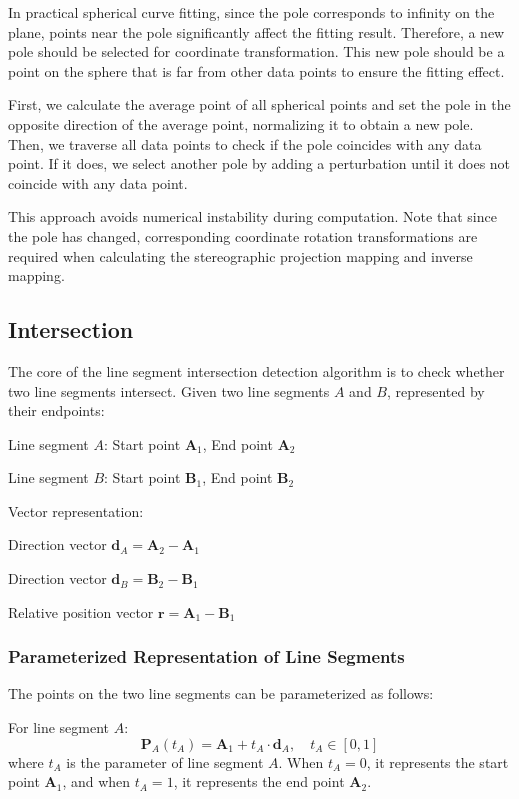 \documentclass[a4paper]{article}
\begin{document}
\begin{sloppypar}
In practical spherical curve fitting, since the pole corresponds to infinity on the plane, points near the pole significantly affect the fitting result. Therefore, a new pole should be selected for coordinate transformation. This new pole should be a point on the sphere that is far from other data points to ensure the fitting effect.

First, we calculate the average point of all spherical points and set the pole in the opposite direction of the average point, normalizing it to obtain a new pole. Then, we traverse all data points to check if the pole coincides with any data point. If it does, we select another pole by adding a perturbation until it does not coincide with any data point.

This approach avoids numerical instability during computation. Note that since the pole has changed, corresponding coordinate rotation transformations are required when calculating the stereographic projection mapping and inverse mapping.

\subsection{Intersection}
The core of the line segment intersection detection algorithm is to check whether two line segments intersect. Given two line segments \(A\) and \(B\), represented by their endpoints:

Line segment \(A\): Start point \(\mathbf{A}_1\), End point \(\mathbf{A}_2\)

Line segment \(B\): Start point \(\mathbf{B}_1\), End point \(\mathbf{B}_2\)

Vector representation:

Direction vector \(\mathbf{d}_A = \mathbf{A}_2 - \mathbf{A}_1\)

Direction vector \(\mathbf{d}_B = \mathbf{B}_2 - \mathbf{B}_1\)

Relative position vector \(\mathbf{r} = \mathbf{A}_1 - \mathbf{B}_1\)

\subsubsection{Parameterized Representation of Line Segments}

The points on the two line segments can be parameterized as follows:

For line segment \(A\):
\[
\mathbf{P}_A(t_A) = \mathbf{A}_1 + t_A \cdot \mathbf{d}_A, \quad t_A \in [0, 1]
\]
where \(t_A\) is the parameter of line segment \(A\). When \(t_A = 0\), it represents the start point \(\mathbf{A}_1\), and when \(t_A = 1\), it represents the end point \(\mathbf{A}_2\).


\end{sloppypar}
\end{document}
